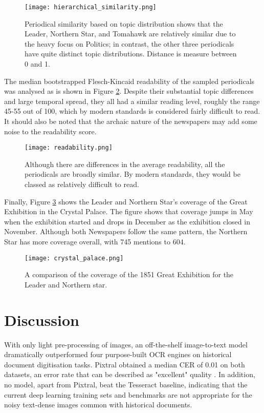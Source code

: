 \documentclass{article} %
\begin{document}
\begin{figure}
    \centering
    \texttt{[image: hierarchical\_similarity.png]}
    \caption{Periodical similarity based on topic distribution shows that the Leader, Northern Star, and Tomahawk are relatively similar due to the heavy focus on Politics; in contrast, the other three periodicals have quite distinct topic distributions. Distance is measure between 0 and 1.}
    \label{fig:topic_similarity}
\end{figure}

The median bootstrapped Flesch-Kincaid readability of the sampled periodicals was analysed as is shown in Figure \ref{fig:readability}. Despite their substantial topic differences and large temporal spread, they all had a similar reading level, roughly the range 45-55 out of 100, which by modern standards is considered fairly difficult to read. It should also be noted that the archaic nature of the newspapers may add some noise to the readability score. 

\begin{figure}
    \centering
    \texttt{[image: readability.png]}
    \caption{Although there are differences in the average readability, all the periodicals are broadly similar. By modern standards, they would be classed as relatively difficult to read.}
    \label{fig:readability}
\end{figure}

Finally, Figure \ref{fig:crystal_palace} shows the Leader and Northern Star's coverage of the Great Exhibition in the Crystal Palace. The figure shows that coverage jumps in May when the exhibition started and drops in December as the exhibition closed in November. Although both Newspapers follow the same pattern, the Northern Star has more coverage overall, with 745 mentions to 604.

\begin{figure}
    \centering
    \texttt{[image: crystal\_palace.png]}
    \caption{A comparison of the coverage of the 1851 Great Exhibition for the Leader and Northern star.}
    \label{fig:crystal_palace}
\end{figure}

\FloatBarrier
\section{Discussion}

With only light pre-processing of images, an off-the-shelf image-to-text model dramatically outperformed four purpose-built OCR engines on historical document digitisation tasks. Pixtral obtained a median CER of 0.01 on both datasets, an error rate that can be described as "excellent" quality \cite{hodel_general_2021}. In addition, no model, apart from Pixtral, beat the Tesseract baseline, indicating that the current deep learning training sets and benchmarks are not appropriate for the noisy text-dense images common with historical documents. 
\end{document}
